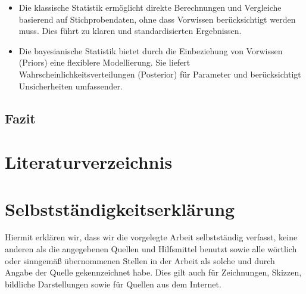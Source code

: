 \documentclass[a4paper,12pt]{article}
\begin{document}
\begin{itemize}
  \item Die klassische Statistik ermöglicht direkte Berechnungen und Vergleiche basierend auf Stichprobendaten, ohne dass Vorwissen berücksichtigt werden muss. Dies führt zu klaren und standardisierten Ergebnissen.
  \item Die bayesianische Statistik bietet durch die Einbeziehung von Vorwissen (Priors) eine flexiblere Modellierung. Sie liefert Wahrscheinlichkeitsverteilungen (Posterior) für Parameter und berücksichtigt Unsicherheiten umfassender.
\end{itemize}

\newpage

\subsection{Fazit}

\newpage

\section{Literaturverzeichnis} 

\printbibliography 
\newpage

\section{Selbstständigkeitserklärung}
Hiermit erklären wir, dass wir die vorgelegte Arbeit
selbstständig verfasst, keine anderen als die angegebenen Quellen und Hilfsmittel
benutzt sowie alle wörtlich oder sinngemäß übernommenen Stellen in der Arbeit als
solche und durch Angabe der Quelle gekennzeichnet habe. Dies gilt auch für Zeichnungen, 
Skizzen, bildliche Darstellungen sowie für Quellen aus dem Internet.
\end{document}

